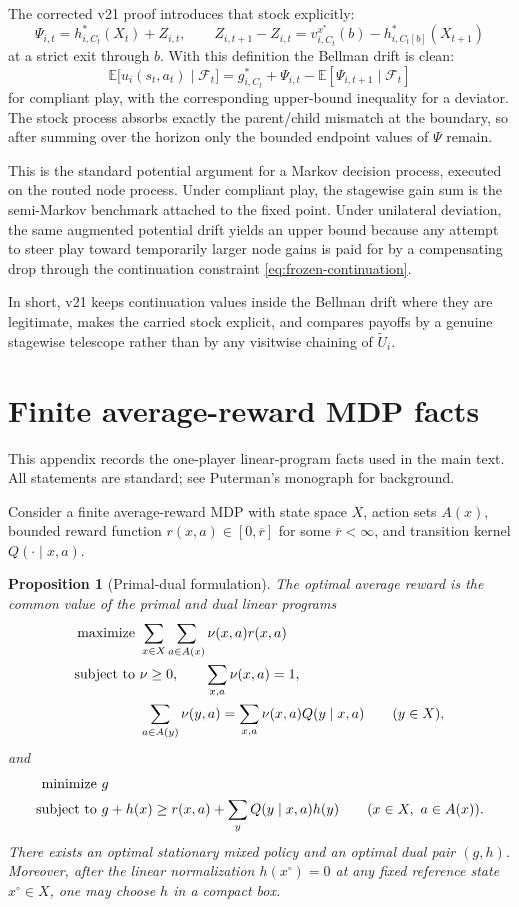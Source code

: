 \documentclass[12pt]{article}
\newtheorem{proposition}[theorem]{Proposition}
\theoremstyle{definition}
\newcommand{\E}{\mathbb{E}}
\newcommand{\1}{\mathbf{1}}
\newcommand{\cF}{\mathcal{F}}
\begin{document}
The corrected v21 proof introduces that stock explicitly:
\[
\Psi_{i,t}
=
h_{i,C_t}^*(X_t)+Z_{i,t},
\qquad
Z_{i,t+1}-Z_{i,t}
=
v_{i,C_t}^{x^*}(b)-h_{i,C_t[b]}^*(X_{t+1})
\]
at a strict exit through $b$. With this definition the Bellman drift is clean:
\[
\E\bigl[u_i(s_t,a_t)\mid \cF_t\bigr]
=
g_{i,C_t}^*
+
\Psi_{i,t}
-
\E[\Psi_{i,t+1}\mid \cF_t]
\]
for compliant play, with the corresponding upper-bound inequality for a
deviator. The stock process absorbs exactly the parent/child mismatch at the
boundary, so after summing over the horizon only the bounded endpoint values of
$\Psi$ remain.

This is the standard potential argument for a Markov decision process, executed on
the routed node process. Under compliant play, the stagewise gain sum is the
semi-Markov benchmark attached to the fixed point. Under unilateral deviation,
the same augmented potential drift yields an upper bound because any attempt to
steer play toward temporarily larger node gains is paid for by a compensating
drop through the continuation constraint \eqref{eq:frozen-continuation}.

In short, v21 keeps continuation values inside the Bellman drift where they are
legitimate, makes the carried stock explicit, and compares payoffs by a genuine
stagewise telescope rather than by any visitwise chaining of
$\widetilde U_i$.
\appendix



\section{Finite average-reward MDP facts}
\label{app:mdp}

This appendix records the one-player linear-program facts used in the main text.
All statements are standard; see Puterman's monograph \cite{Puterman1994} for
background.

Consider a finite average-reward MDP with state space $X$, action sets $A(x)$,
bounded reward function $r(x,a)\in[0,\overline r]$ for some $\overline r<\infty$,
and transition kernel $Q(\cdot\mid x,a)$.

\begin{proposition}[Primal-dual formulation]
\label{prop:mdp-duality}
The optimal average reward is the common value of the primal and dual linear
programs
\begin{align*}
\textnormal{maximize }&\sum_{x\in X}\sum_{a\in A(x)}\nu(x,a)r(x,a)
\\
\textnormal{subject to }&\nu\ge 0,
\qquad \sum_{x,a}\nu(x,a)=1,
\\
&\sum_{a\in A(y)}\nu(y,a)=\sum_{x,a}\nu(x,a)Q(y\mid x,a)
\qquad (y\in X),
\end{align*}
and
\begin{align*}
\textnormal{minimize }&g
\\
\textnormal{subject to }&g+h(x)\ge r(x,a)+\sum_y Q(y\mid x,a)h(y)
\qquad (x\in X,\ a\in A(x)).
\end{align*}
There exists an optimal stationary mixed policy and an optimal dual pair $(g,h)$.
Moreover, after the linear normalization $h(x^\circ)=0$ at any fixed reference
state $x^\circ\in X$, one may choose $h$ in a compact box.
\end{proposition}
\end{document}
